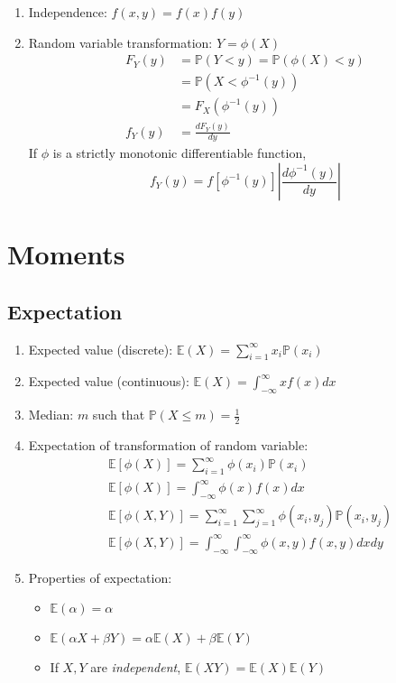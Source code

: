 \documentclass[%
 aip,
 jmp,%
 amsmath,amssymb,
 reprint,%
]{revtex4-1}
\def\P{\mathbb{P}}
\def\E{\mathbb{E}}
\begin{document}
\begin{enumerate}
   \item Independence: $f(x,y)=f(x)f(y)$

   \item Random variable transformation: $Y = \phi(X)$\\
       \begin{align*}
         F_Y(y) &= \P(Y < y) = \P(\phi(X) < y) \\
                &= \P(X < \phi^{-1}(y)) \\
                &= F_X(\phi^{-1}(y)) \\
         f_Y(y) &= \frac{dF_Y(y)}{dy}
       \end{align*}
       If $\phi$ is a strictly monotonic differentiable function,
       $$ f_Y(y) = f[\phi^{-1}(y)]\left\rvert\frac{d\phi^{-1}(y)}{dy}\right\rvert $$

\end{enumerate}


\section{Moments}
\subsection{Expectation}
\begin{enumerate}
    \item Expected value (discrete): $\E(X) = \sum_{i=1}^{\infty}x_i\P(x_i)$
    \item Expected value (continuous): $\E(X) = \int_{-\infty}^{\infty} xf(x) dx$
    \item Median: $m$ such that $\P(X \le m) = \frac{1}{2}$
    \item Expectation of transformation of random variable:
        \begin{align*}
            & \E[\phi(X)] = \sum_{i=1}^{\infty} \phi(x_i) \P(x_i) \\
            & \E[\phi(X)] = \int_{-\infty}^{\infty} \phi(x)f(x) dx \\
            & \E[\phi(X,Y)] = \sum_{i=1}^{\infty}\sum_{j=1}^{\infty} \phi(x_i,y_j) \P(x_i,y_j) \\
            & \E[\phi(X,Y)] = \int_{-\infty}^{\infty}\int_{-\infty}^{\infty} \phi(x,y)f(x,y) dxdy
        \end{align*}
    \item Properties of expectation:
        \begin{itemize}
            \item $\E(\alpha)=\alpha$
            \item $\E(\alpha X + \beta Y) = \alpha\E(X) + \beta\E(Y)$
            \item If $X,Y$ are \emph{independent}, $\E(XY) = \E(X)\E(Y)$
        \end{itemize}
\end{enumerate}
\end{document}
